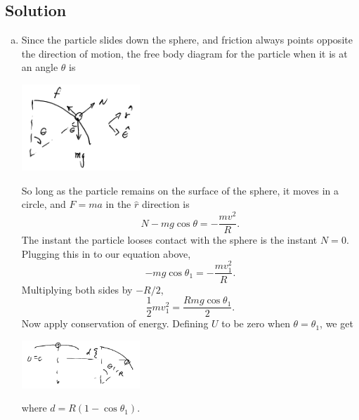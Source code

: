 \documentclass[solutions]{esg8012exam}
\begin{document}
\subsection{Solution}
  \begin{enumerate}[(a)]
    \item Since the particle slides down the sphere, and friction always points opposite the direction of motion, the free body diagram for the particle when it is at an angle $\theta$ is
      \begin{center}\includegraphics[width=0.35\textwidth]{exam2_s2_1}\end{center}
      So long as the particle remains on the surface of the sphere, it moves in a circle, and $F = ma$ in the $\hat r$ direction is
      \begin{equation*} N - m g \cos\theta = -\frac{mv^2}{R}. \end{equation*}
      The instant the particle looses contact with the sphere is the instant $N = 0$.  Plugging this in to our equation above,
      \begin{equation*} -mg \cos\theta_1 = -\frac{mv_1^2}{R}. \end{equation*}%
      Multiplying both sides by $-R / 2$,
      \begin{equation} \frac12 m v_1^2 = \frac{R mg \cos\theta_1}{2}. \label{eq:2:F=ma_loose_contact_changed} \end{equation}
      Now apply conservation of energy.  Defining $U$ to be zero when $\theta = \theta_1$, we get
      \begin{center}\includegraphics[width=0.35\textwidth]{exam2_s2_2}\end{center}
      where $d = R(1 - \cos\theta_1)$.


\end{enumerate}
\end{document}
